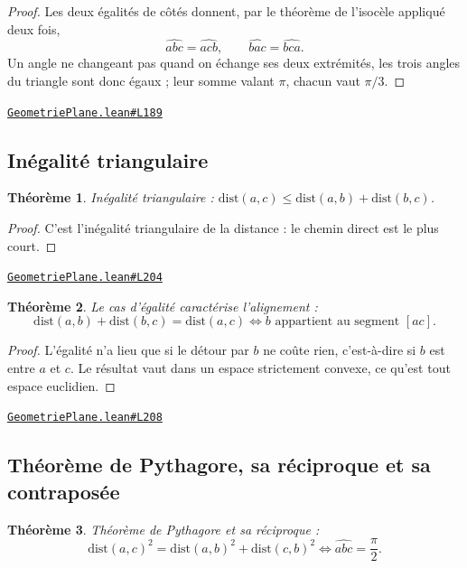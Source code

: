 \documentclass[11pt,a4paper]{article}
\theoremstyle{definition}
\theoremstyle{plain}
\newtheorem{theoreme}{Théorème}
\newcommand{\source}[2]{\par\smallskip\noindent\hfill{\footnotesize\href{#1}{\texttt{#2}}}\par\smallskip}
\begin{document}
\begin{proof}
Les deux égalités de côtés donnent, par le théorème de l'isocèle appliqué deux fois,
\[ \widehat{abc} = \widehat{acb}, \qquad \widehat{bac} = \widehat{bca} . \]
Un angle ne changeant pas quand on échange ses deux extrémités, les trois angles du
triangle sont donc égaux ; leur somme valant $\pi$, chacun vaut $\pi/3$.
\end{proof}
\source{https://github.com/Commutator-IO/learn-lean/blob/main/courses/01-college/02-geometrie-plane/GeometriePlane.lean\#L189}{GeometriePlane.lean\#L189}

\subsection{Inégalité triangulaire}

\begin{theoreme}
Inégalité triangulaire : $\mathrm{dist}(a,c) \le \mathrm{dist}(a,b) + \mathrm{dist}(b,c)$.
\end{theoreme}

\begin{proof}
C'est l'inégalité triangulaire de la distance : le chemin direct est le plus court.
\end{proof}
\source{https://github.com/Commutator-IO/learn-lean/blob/main/courses/01-college/02-geometrie-plane/GeometriePlane.lean\#L204}{GeometriePlane.lean\#L204}

\begin{theoreme}
Le cas d'égalité caractérise l'alignement :
\[ \mathrm{dist}(a,b) + \mathrm{dist}(b,c) = \mathrm{dist}(a,c)
   \iff b \text{ appartient au segment } [ac] . \]
\end{theoreme}

\begin{proof}
L'égalité n'a lieu que si le détour par $b$ ne coûte rien, c'est-à-dire si $b$ est entre
$a$ et $c$. Le résultat vaut dans un espace strictement convexe, ce qu'est tout espace
euclidien.
\end{proof}
\source{https://github.com/Commutator-IO/learn-lean/blob/main/courses/01-college/02-geometrie-plane/GeometriePlane.lean\#L208}{GeometriePlane.lean\#L208}

\subsection{Théorème de Pythagore, sa réciproque et sa contraposée}

\begin{theoreme}
Théorème de Pythagore et sa réciproque :
\[ \mathrm{dist}(a,c)^2 = \mathrm{dist}(a,b)^2 + \mathrm{dist}(c,b)^2
   \iff \widehat{abc} = \frac{\pi}{2} . \]
\end{theoreme}
\end{document}
